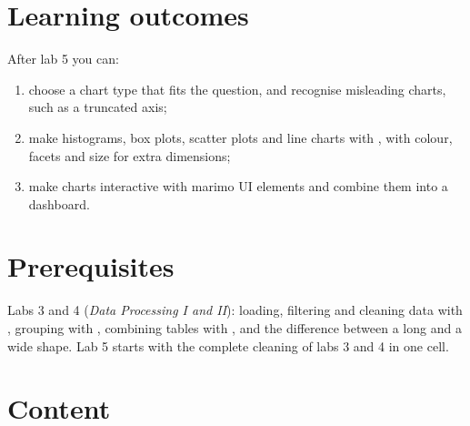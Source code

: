 \documentclass[11pt,a4paper]{article}
\begin{document}



\section{Learning outcomes}

After lab 5 you can:

\begin{enumerate}[label=\textbf{LO\arabic*}, leftmargin=1.4cm]
  \item choose a chart type that fits the question, and recognise
        misleading charts, such as a truncated axis;
  \item make histograms, box plots, scatter plots and line charts with
        , with colour, facets and size for extra
        dimensions;
  \item make charts interactive with marimo UI elements and combine them
        into a dashboard.
\end{enumerate}

\section{Prerequisites}

Labs 3 and 4 (\emph{Data Processing I and II}): loading, filtering and
cleaning data with , grouping with , combining
tables with , and the difference between a long and a wide
shape. Lab 5 starts with the complete cleaning of labs 3 and 4 in one
cell.





\section{Content}


\end{document}

